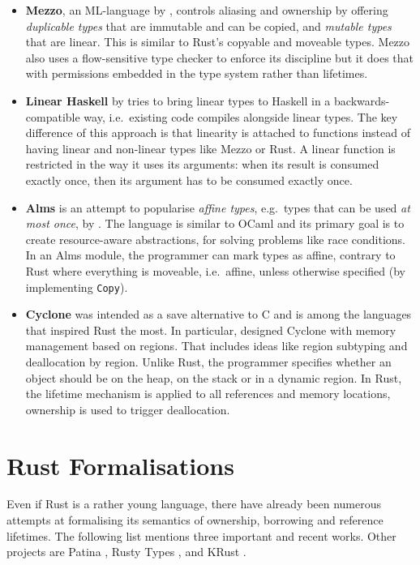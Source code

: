 \begin{itemize}
\item \textbf{Mezzo}, an ML-language by \citet{mezzo}, controls aliasing and
ownership by offering \emph{duplicable types} that are immutable and can be
copied, and \emph{mutable types} that are linear. This is similar to Rust's
copyable and moveable types. Mezzo also uses a flow-sensitive type checker to
enforce its discipline but it does that with permissions embedded in the type
system rather than lifetimes.

\item \textbf{Linear Haskell} by \citet{linear-haskell} tries to bring linear
types to Haskell in a backwards-compatible way, i.e.~existing code compiles
alongside linear types. The key difference of this approach is that linearity is
attached to functions instead of having linear and non-linear types like Mezzo
or Rust. A linear function is restricted in the way it uses its arguments: when
its result is consumed exactly once, then its argument has to be consumed
exactly once.

\item \textbf{Alms} is an attempt to popularise \emph{affine types}, e.g.~types
that can be used \emph{at most once}, by \citet{alms}. The language is similar
to OCaml and its primary goal is to create resource-aware abstractions, for
solving problems like race conditions. In an Alms module, the programmer can
mark types as affine, contrary to Rust where everything is moveable,
i.e.~affine, unless otherwise specified (by implementing \lstinline!Copy!).

\item \textbf{Cyclone} was intended as a save alternative to C and is among the
languages that inspired Rust the most. In particular, \citet{cyclone-region}
designed Cyclone with memory management based on regions. That includes ideas
like region subtyping and deallocation by region. Unlike Rust, the programmer
specifies whether an object should be on the heap, on the stack or in a dynamic
region. In Rust, the lifetime mechanism is applied to all references and memory
locations, ownership is used to trigger deallocation.
\end{itemize}


\section{Rust Formalisations}

Even if Rust is a rather young language, there have already been numerous
attempts at formalising its semantics of ownership, borrowing and reference
lifetimes. The following list mentions three important and recent works. Other
projects are Patina \cite{patina}, Rusty Types \cite{rusty-types}, and KRust
\cite{krust}.

